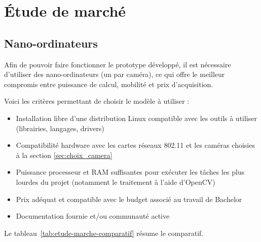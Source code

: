 \chapter{Étude de marché}
\label{ch:etude-de-marche}

\section{Nano-ordinateurs}

Afin de pouvoir faire fonctionner le prototype développé, il est nécessaire d’utiliser des nano-ordinateurs (un par
caméra), ce qui offre le meilleur compromis entre puissance de calcul, mobilité et prix d’acquisition.

Voici les critères permettant de choisir le modèle à utiliser :
\begin{itemize}
\item Installation libre d’une distribution Linux compatible avec les outils à utiliser (librairies, langages, drivers)
\item Compatibilité hardware avec les cartes réseaux 802.11 et les caméras choisies à la section \ref{sec:choix_camera}
\item Puissance processeur et RAM suffisantes pour exécuter les tâches les plus lourdes du projet (notamment le traitement à l'aide d'OpenCV)
\item Prix adéquat et compatible avec le budget associé au travail de Bachelor
\item Documentation fournie et/ou communauté active
\end{itemize}

Le tableau~\ref{tab:etude-marche-comparatif} résume le comparatif.

